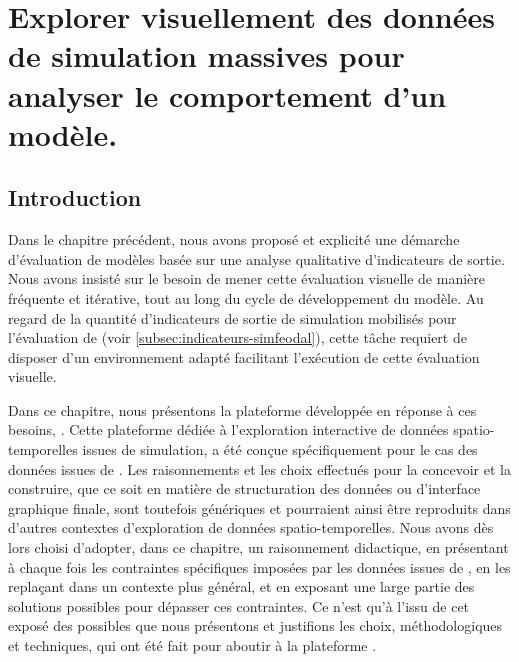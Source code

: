 \setcounter{chapter}{3}
\graphicspath{{chap4/}}

\chapter{Explorer visuellement des données de simulation massives pour analyser le comportement d'un modèle.}
\label{chap:chap4}
\setcounter{minitocdepth}{2}
\vfill
{}
\minitoc
{}
\clearpage
{}

\section*{Introduction}

Dans le chapitre précédent, nous avons proposé et explicité une démarche d'évaluation de modèles basée sur une analyse qualitative d'indicateurs de sortie.
Nous avons insisté sur le besoin de mener cette \og évaluation visuelle\fg{} de manière fréquente et itérative, tout au long du cycle de développement du modèle.
Au regard de la quantité d'indicateurs de sortie de simulation mobilisés pour l'évaluation de \simfeodal{} (voir \cref{subsec:indicateurs-simfeodal}), cette tâche requiert de disposer d'un environnement adapté facilitant l'exécution de cette évaluation visuelle.

Dans ce chapitre, nous présentons la plateforme développée en réponse à ces besoins, \simedb{}.
Cette plateforme dédiée à l'exploration interactive de données spatio-temporelles issues de simulation, a été conçue spécifiquement pour le cas des données issues de \simfeodal{}.
Les raisonnements et les choix effectués pour la concevoir et la construire, que ce soit en matière de structuration des données ou d'interface graphique finale, sont toutefois génériques et pourraient ainsi être reproduits dans d'autres contextes d'exploration de données spatio-temporelles.
Nous avons dès lors choisi d'adopter, dans ce chapitre, un raisonnement didactique, en présentant à chaque fois les contraintes spécifiques imposées par les données issues de \simfeodal{}, en les replaçant dans un contexte plus général, et en exposant une large partie des solutions possibles pour dépasser ces contraintes.
Ce n'est qu'à l'issu de cet exposé des possibles que nous présentons et justifions les choix, méthodologiques et techniques, qui ont été fait pour aboutir à la plateforme \simedb.	

